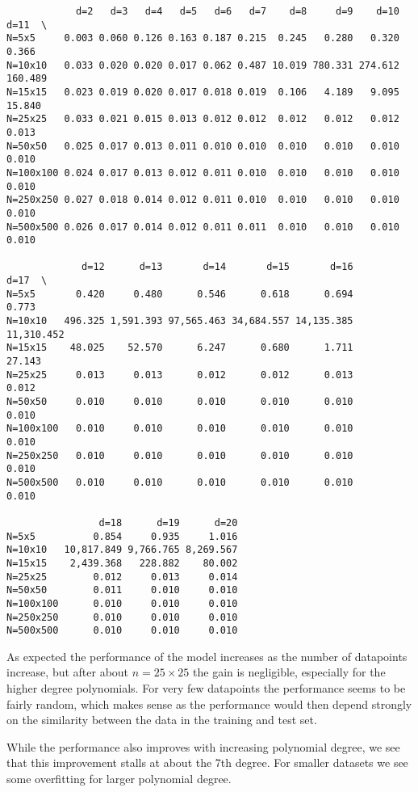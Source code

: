 \documentclass[11pt]{article}
\begin{document}
    
    \begin{verbatim}
            d=2   d=3   d=4   d=5   d=6   d=7    d=8     d=9    d=10    d=11  \
N=5x5     0.003 0.060 0.126 0.163 0.187 0.215  0.245   0.280   0.320   0.366   
N=10x10   0.033 0.020 0.020 0.017 0.062 0.487 10.019 780.331 274.612 160.489   
N=15x15   0.023 0.019 0.020 0.017 0.018 0.019  0.106   4.189   9.095  15.840   
N=25x25   0.033 0.021 0.015 0.013 0.012 0.012  0.012   0.012   0.012   0.013   
N=50x50   0.025 0.017 0.013 0.011 0.010 0.010  0.010   0.010   0.010   0.010   
N=100x100 0.024 0.017 0.013 0.012 0.011 0.010  0.010   0.010   0.010   0.010   
N=250x250 0.027 0.018 0.014 0.012 0.011 0.010  0.010   0.010   0.010   0.010   
N=500x500 0.026 0.017 0.014 0.012 0.011 0.011  0.010   0.010   0.010   0.010   

             d=12      d=13       d=14       d=15       d=16       d=17  \
N=5x5       0.420     0.480      0.546      0.618      0.694      0.773   
N=10x10   496.325 1,591.393 97,565.463 34,684.557 14,135.385 11,310.452   
N=15x15    48.025    52.570      6.247      0.680      1.711     27.143   
N=25x25     0.013     0.013      0.012      0.012      0.013      0.012   
N=50x50     0.010     0.010      0.010      0.010      0.010      0.010   
N=100x100   0.010     0.010      0.010      0.010      0.010      0.010   
N=250x250   0.010     0.010      0.010      0.010      0.010      0.010   
N=500x500   0.010     0.010      0.010      0.010      0.010      0.010   

                d=18      d=19      d=20  
N=5x5          0.854     0.935     1.016  
N=10x10   10,817.849 9,766.765 8,269.567  
N=15x15    2,439.368   228.882    80.002  
N=25x25        0.012     0.013     0.014  
N=50x50        0.011     0.010     0.010  
N=100x100      0.010     0.010     0.010  
N=250x250      0.010     0.010     0.010  
N=500x500      0.010     0.010     0.010  
    \end{verbatim}

    
    As expected the performance of the model increases as the number of
datapoints increase, but after about \(n=25\times25\) the gain is
negligible, especially for the higher degree polynomials. For very few
datapoints the performance seems to be fairly random, which makes sense
as the performance would then depend strongly on the similarity between
the data in the training and test set.

While the performance also improves with increasing polynomial degree,
we see that this improvement stalls at about the 7th degree. For smaller
datasets we see some overfitting for larger polynomial degree.
\end{document}
